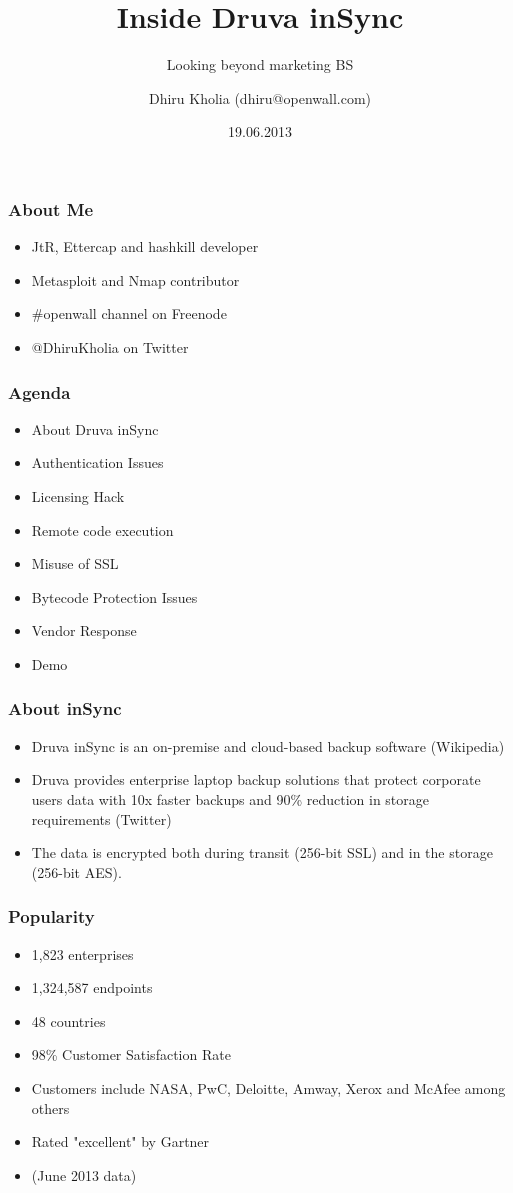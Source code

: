 \documentclass{beamer}
\title{Inside Druva inSync}
\subtitle{Looking beyond marketing BS}
\author{Dhiru Kholia (dhiru@openwall.com)}
\date{19.06.2013}
\begin{document}
\frame{\titlepage}

\begin{frame}
	\frametitle{About Me}
	\begin{itemize}
		\item JtR, Ettercap and hashkill developer
		\item Metasploit and Nmap contributor
		\item \#openwall channel on Freenode
		\item @DhiruKholia on Twitter
	\end{itemize}
\end{frame}

\begin{frame}
	\frametitle{Agenda}
	\begin{itemize}
		\item About Druva inSync
		\item Authentication Issues
		\item Licensing Hack
		\item Remote code execution
		\item Misuse of SSL
		\item Bytecode Protection Issues
		\item Vendor Response
		\item Demo
	\end{itemize}
\end{frame}

\begin{frame}
	\frametitle{About inSync}
	\begin{itemize}
		\item Druva inSync is an on-premise and cloud-based
		backup software (Wikipedia)
		\item Druva provides enterprise laptop backup solutions that
		protect corporate users data with 10x faster backups and 90\% reduction
		in storage requirements (Twitter)
		\item The data is encrypted both during transit (256-bit SSL) and
		in the storage (256-bit AES).
	\end{itemize}
\end{frame}

\begin{frame}
	\frametitle{Popularity}
	\begin{itemize}
		\item 1,823 enterprises
		\item 1,324,587 endpoints
		\item 48 countries
		\item 98\% Customer Satisfaction Rate
		\item Customers include NASA, PwC, Deloitte, Amway, Xerox and McAfee among others
		\item Rated "excellent" by Gartner
		\item (June 2013 data)
	\end{itemize}
\end{frame}
\end{document}
